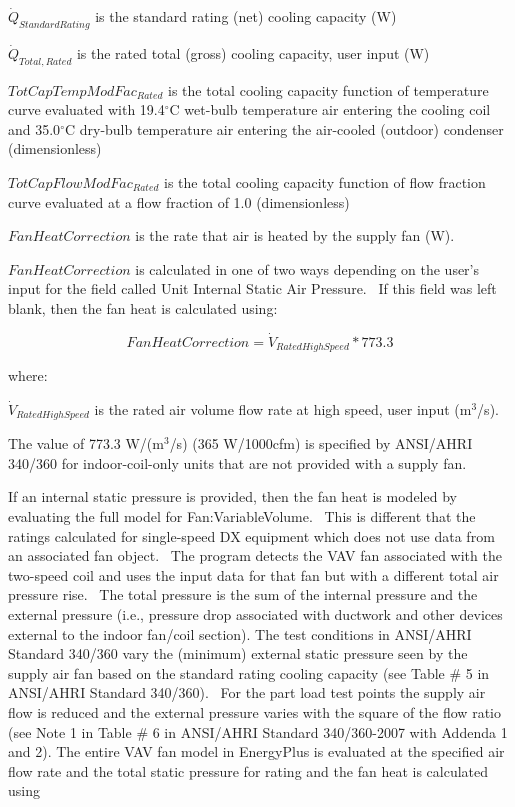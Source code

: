 \({\dot Q_{StandardRating}}\) is the standard rating (net) cooling capacity (W)

\({\dot Q_{Total,Rated}}\) is the rated total (gross) cooling capacity, user input (W)

\(TotCapTempModFa{c_{Rated}}\) is the total cooling capacity function of temperature curve evaluated with 19.4\(^{\circ}\)C wet-bulb temperature air entering the cooling coil and 35.0\(^{\circ}\)C dry-bulb temperature air entering the air-cooled (outdoor) condenser (dimensionless)

\(TotCapFlowModFa{c_{Rated}}\) is the total cooling capacity function of flow fraction curve evaluated at a flow fraction of 1.0 (dimensionless)

\(FanHeatCorrection\) is the rate that air is heated by the supply fan (W).

\(FanHeatCorrection\) is calculated in one of two ways depending on the user's input for the field called Unit Internal Static Air Pressure.~ If this field was left blank, then the fan heat is calculated using:

\begin{equation}
FanHeatCorrection = {\dot V_{RatedHighSpeed}}*773.3
\end{equation}

where:

\({\dot V_{RatedHighSpeed}}\) is the rated air volume flow rate at high speed, user input (m\(^{3}\)/s).

The value of 773.3 W/(m\(^{3}\)/s) (365 W/1000cfm) is specified by ANSI/AHRI 340/360 for indoor-coil-only units that are not provided with a supply fan.

If an internal static pressure is provided, then the fan heat is modeled by evaluating the full model for Fan:VariableVolume.~ This is different that the ratings calculated for single-speed DX equipment which does not use data from an associated fan object.~ The program detects the VAV fan associated with the two-speed coil and uses the input data for that fan but with a different total air pressure rise.~ The total pressure is the sum of the internal pressure and the external pressure (i.e., pressure drop associated with ductwork and other devices external to the indoor fan/coil section). The test conditions in ANSI/AHRI Standard 340/360 vary the (minimum) external static pressure seen by the supply air fan based on the standard rating cooling capacity (see Table \# 5 in ANSI/AHRI Standard 340/360).~ For the part load test points the supply air flow is reduced and the external pressure varies with the square of the flow ratio (see Note 1 in Table \# 6 in ANSI/AHRI Standard 340/360-2007 with Addenda 1 and 2). The entire VAV fan model in EnergyPlus is evaluated at the specified air flow rate and the total static pressure for rating and the fan heat is calculated using

